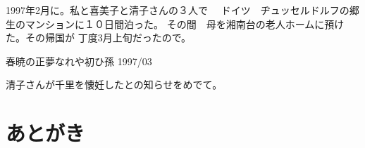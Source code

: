 \documentclass[b5paper]{tbook}
\begin{document}
1997年2月に。私と喜美子と清子さんの３人で　
ドイツ　ヂュッセルドルフの郷生のマンションに１０日間泊った。
その間　母を湘南台の老人ホームに預けた。その帰国が
丁度3月上旬だったので。
\vspace{5mm}

\begin{shiika}春暁の正夢なれや初ひ孫 1997/03\end{shiika}

清子さんが千里を懐妊したとの知らせをめでて。


%


\chapter*{あとがき}



%
\end{document}
